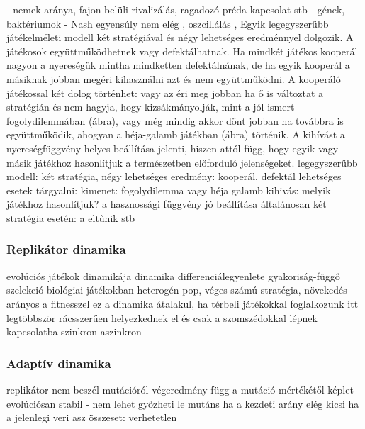- nemek aránya, fajon belüli rivalizálás, ragadozó-préda kapcsolat stb
- gének, baktériumok
- Nash egyensúly nem elég , oszcillálás , 
Egyik legegyszerűbb játékelméleti modell két stratégiával és négy lehetséges eredménnyel dolgozik. A játékosok együttműködhetnek vagy defektálhatnak. Ha mindkét játékos kooperál nagyon a nyereségük mintha mindketten defektálnának, de ha egyik kooperál a másiknak jobban megéri kihasználni azt és nem együttműködni. A kooperáló játékossal két dolog történhet: vagy az éri meg jobban ha ő is változtat a stratégián és nem hagyja, hogy kizsákmányolják, mint a jól ismert fogolydilemmában (ábra), vagy még mindig akkor dönt jobban ha továbbra is együttműködik, ahogyan a héja-galamb játékban (ábra) történik. A kihívást a nyereségfüggvény helyes beállítása jelenti, hiszen attól függ, hogy egyik vagy másik játékhoz hasonlítjuk a természetben előforduló jelenségeket. 
legegyszerűbb modell: két stratégia, négy lehetséges eredmény: kooperál, defektál
lehetséges esetek tárgyalni: kimenet: fogolydilemma vagy héja galamb
kihivás: melyik játékhoz hasonlítjuk? a hasznossági függvény jó beállítása
általánosan két stratégia esetén: a eltűnik stb

\subsubsection{Replikátor dinamika}
evolúciós játékok dinamikája
dinamika differenciálegyenlete 
gyakoriság-függő szelekció biológiai játékokban
heterogén pop, véges számú stratégia, növekedés arányos a fitnesszel
ez a dinamika átalakul, ha térbeli játékokkal foglalkozunk
itt legtöbbször rácsszerűen helyezkednek el és csak a szomszédokkal lépnek kapcsolatba
szinkron aszinkron

\subsubsection{Adaptív dinamika}
replikátor  nem beszél mutációról
végeredmény függ a mutáció mértékétől
képlet
evolúciósan stabil - nem lehet győzheti le mutáns ha a kezdeti arány elég kicsi
ha a jelenlegi veri asz összeset: verhetetlen


\iffalse
Kezdetben a darwini kiválasztódást próbálták modellezni a játékelmélet eszközeinek segítségével. 


Játékok típusai, osztályozás
Evol. játékok mint egy ág

\subsection{Evolúciós stabil stratégia -- fitnesz mint nyereség}
\subsection{Játékok dinamikája(Dynamic game theory)}
\subsubsection{Replikátor dinamika}
\subsubsection{Adaptív dinamika (Adaptive dynamics)}
\subsection{Térbeli játékok (spatial games)}

\fi
